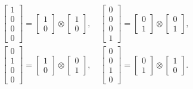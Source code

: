 \begin{equation}\label{eq:prodtens1}
	\begin{split}
&\begin{bmatrix}
1 \\
0 \\
0 \\
0
\end{bmatrix} = \begin{bmatrix}
1 \\
0
\end{bmatrix} \otimes \begin{bmatrix}
1 \\
0
\end{bmatrix}, \quad
\begin{bmatrix}
0 \\
0 \\
0 \\
1
\end{bmatrix} = \begin{bmatrix}
0 \\
1
\end{bmatrix} \otimes \begin{bmatrix}
0 \\
1
\end{bmatrix}, \\
&\begin{bmatrix}
0 \\
1 \\
0 \\
0
\end{bmatrix} = \begin{bmatrix}
1 \\
0
\end{bmatrix} \otimes \begin{bmatrix}
0 \\
1
\end{bmatrix}, \quad
\begin{bmatrix}
0 \\
0 \\
1 \\
0
\end{bmatrix} = \begin{bmatrix}
0 \\
1
\end{bmatrix} \otimes \begin{bmatrix}
1 \\
0
\end{bmatrix}.
	\end{split}
\end{equation}

